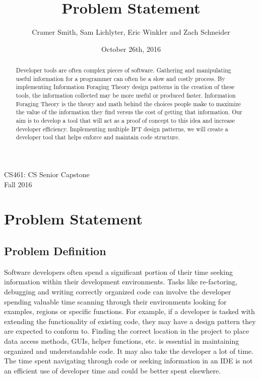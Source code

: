 \documentclass[letterpaper,10pt,titlepage,draftclsnofoot,onecolumn] {IEEEtran}
\title{Problem Statement}
\author{Cramer Smith, Sam Lichlyter, Eric Winkler and Zach Schneider}
\date{October 26th, 2016}
\begin{document}
\begin{titlepage}

\maketitle
\begin{center}
CS461: CS Senior Capstone \\
Fall 2016

\begin{abstract}

Developer tools are often complex pieces of software. Gathering and manipulating useful information for a programmer can often be a slow and costly process. By implementing Information Foraging Theory design patterns in the creation of these tools, the information collected may be more useful or produced faster. Information Foraging Theory is the theory and math behind the choices people make to maximize the value of the information they find versus the cost of getting that information. Our aim is to develop a tool that will act as a proof of concept to this idea and increase developer efficiency. Implementing multiple IFT design patterns, we will create a developer tool that helps enforce and maintain code structure. 

\end{abstract}

\end{center}

\end{titlepage}

\section{Problem Statement}
\subsection{Problem Definition}
Software developers often spend a significant portion of their time seeking information within their development environments. 
Tasks like re-factoring, debugging and writing correctly organized code can involve the developer spending valuable time scanning through their environments looking for examples, regions or specific functions.
For example, if a developer is tasked with extending the functionality of existing code, they may have a design pattern they are expected to conform to. 
Finding the correct location in the project to place data access methods, GUIs, helper functions, etc. is essential in maintaining organized and understandable code. 
It may also take the developer a lot of time.
The time spent navigating through code or seeking information in an IDE is not an efficient use of developer time and could be better spent elsewhere.
\end{document}
